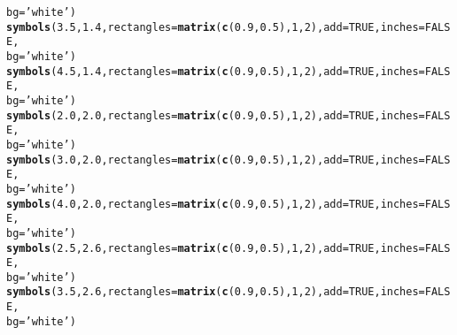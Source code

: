 \documentclass[12pt]{article}\usepackage[]{graphicx}\usepackage[]{color}
\makeatletter
\newcommand{\hlnum}[1]{\textcolor[rgb]{0.686,0.059,0.569}{#1}}%
\newcommand{\hlstr}[1]{\textcolor[rgb]{0.192,0.494,0.8}{#1}}%
\newcommand{\hlstd}[1]{\textcolor[rgb]{0.345,0.345,0.345}{#1}}%
\newcommand{\hlkwc}[1]{\textcolor[rgb]{0.333,0.667,0.333}{#1}}%
\newcommand{\hlkwd}[1]{\textcolor[rgb]{0.737,0.353,0.396}{\textbf{#1}}}%
\newenvironment{kframe}{%
 \def\at@end@of@kframe{}%
 \ifinner\ifhmode%
  \def\at@end@of@kframe{\end{minipage}}%
  \begin{minipage}{\columnwidth}%
 \fi\fi%
 \def\FrameCommand##1{\hskip\@totalleftmargin \hskip-\fboxsep
 \colorbox{shadecolor}{##1}\hskip-\fboxsep
     \hskip-\linewidth \hskip-\@totalleftmargin \hskip\columnwidth}%
 \MakeFramed {\advance\hsize-\width
   \@totalleftmargin\z@ \linewidth\hsize
   \@setminipage}}%
 {\par\unskip\endMakeFramed%
 \at@end@of@kframe}
\newenvironment{knitrout}{}{} %
\makeatother
\begin{document}
\begin{knitrout}
\begin{kframe}
\begin{alltt}
          \hlkwc{bg} \hlstd{=} \hlstr{'white'}\hlstd{)}
  \hlkwd{symbols}\hlstd{(}\hlnum{3.5}\hlstd{,} \hlnum{1.4}\hlstd{,} \hlkwc{rectangles} \hlstd{=} \hlkwd{matrix}\hlstd{(}\hlkwd{c}\hlstd{(}\hlnum{0.9}\hlstd{,} \hlnum{0.5}\hlstd{),} \hlnum{1}\hlstd{,} \hlnum{2}\hlstd{),} \hlkwc{add} \hlstd{=} \hlnum{TRUE}\hlstd{,} \hlkwc{inches} \hlstd{=} \hlnum{FALSE}\hlstd{,}
          \hlkwc{bg} \hlstd{=} \hlstr{'white'}\hlstd{)}
  \hlkwd{symbols}\hlstd{(}\hlnum{4.5}\hlstd{,} \hlnum{1.4}\hlstd{,} \hlkwc{rectangles} \hlstd{=} \hlkwd{matrix}\hlstd{(}\hlkwd{c}\hlstd{(}\hlnum{0.9}\hlstd{,} \hlnum{0.5}\hlstd{),} \hlnum{1}\hlstd{,} \hlnum{2}\hlstd{),} \hlkwc{add} \hlstd{=} \hlnum{TRUE}\hlstd{,} \hlkwc{inches} \hlstd{=} \hlnum{FALSE}\hlstd{,}
          \hlkwc{bg} \hlstd{=} \hlstr{'white'}\hlstd{)}
  \hlkwd{symbols}\hlstd{(}\hlnum{2.0}\hlstd{,} \hlnum{2.0}\hlstd{,} \hlkwc{rectangles} \hlstd{=} \hlkwd{matrix}\hlstd{(}\hlkwd{c}\hlstd{(}\hlnum{0.9}\hlstd{,} \hlnum{0.5}\hlstd{),} \hlnum{1}\hlstd{,} \hlnum{2}\hlstd{),} \hlkwc{add} \hlstd{=} \hlnum{TRUE}\hlstd{,} \hlkwc{inches} \hlstd{=} \hlnum{FALSE}\hlstd{,}
          \hlkwc{bg} \hlstd{=} \hlstr{'white'}\hlstd{)}
  \hlkwd{symbols}\hlstd{(}\hlnum{3.0}\hlstd{,} \hlnum{2.0}\hlstd{,} \hlkwc{rectangles} \hlstd{=} \hlkwd{matrix}\hlstd{(}\hlkwd{c}\hlstd{(}\hlnum{0.9}\hlstd{,} \hlnum{0.5}\hlstd{),} \hlnum{1}\hlstd{,} \hlnum{2}\hlstd{),} \hlkwc{add} \hlstd{=} \hlnum{TRUE}\hlstd{,} \hlkwc{inches} \hlstd{=} \hlnum{FALSE}\hlstd{,}
          \hlkwc{bg} \hlstd{=} \hlstr{'white'}\hlstd{)}
  \hlkwd{symbols}\hlstd{(}\hlnum{4.0}\hlstd{,} \hlnum{2.0}\hlstd{,} \hlkwc{rectangles} \hlstd{=} \hlkwd{matrix}\hlstd{(}\hlkwd{c}\hlstd{(}\hlnum{0.9}\hlstd{,} \hlnum{0.5}\hlstd{),} \hlnum{1}\hlstd{,} \hlnum{2}\hlstd{),} \hlkwc{add} \hlstd{=} \hlnum{TRUE}\hlstd{,} \hlkwc{inches} \hlstd{=} \hlnum{FALSE}\hlstd{,}
          \hlkwc{bg} \hlstd{=} \hlstr{'white'}\hlstd{)}
  \hlkwd{symbols}\hlstd{(}\hlnum{2.5}\hlstd{,} \hlnum{2.6}\hlstd{,} \hlkwc{rectangles} \hlstd{=} \hlkwd{matrix}\hlstd{(}\hlkwd{c}\hlstd{(}\hlnum{0.9}\hlstd{,} \hlnum{0.5}\hlstd{),} \hlnum{1}\hlstd{,} \hlnum{2}\hlstd{),} \hlkwc{add} \hlstd{=} \hlnum{TRUE}\hlstd{,} \hlkwc{inches} \hlstd{=} \hlnum{FALSE}\hlstd{,}
          \hlkwc{bg} \hlstd{=} \hlstr{'white'}\hlstd{)}
  \hlkwd{symbols}\hlstd{(}\hlnum{3.5}\hlstd{,} \hlnum{2.6}\hlstd{,} \hlkwc{rectangles} \hlstd{=} \hlkwd{matrix}\hlstd{(}\hlkwd{c}\hlstd{(}\hlnum{0.9}\hlstd{,} \hlnum{0.5}\hlstd{),} \hlnum{1}\hlstd{,} \hlnum{2}\hlstd{),} \hlkwc{add} \hlstd{=} \hlnum{TRUE}\hlstd{,} \hlkwc{inches} \hlstd{=} \hlnum{FALSE}\hlstd{,}
          \hlkwc{bg} \hlstd{=} \hlstr{'white'}\hlstd{)}

\end{alltt}
\end{kframe}
\end{knitrout}
\end{document}
